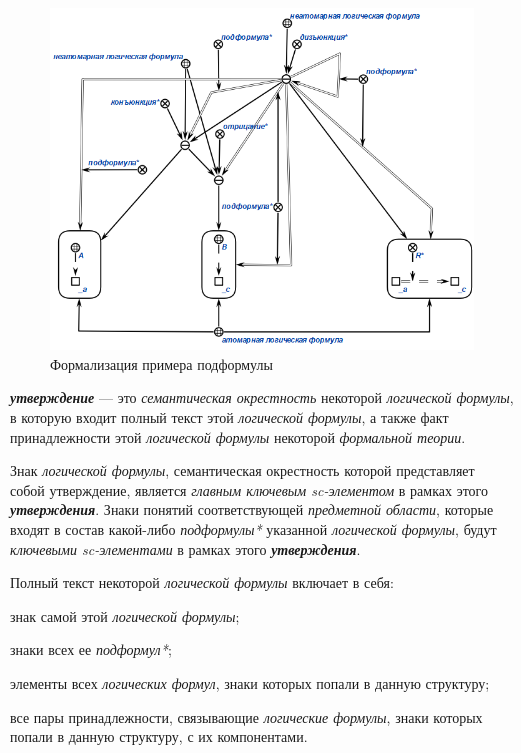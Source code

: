 \begin{SCn}
\end{SCn}

\begin{figure}[H]
	\includegraphics[scale=0.8]{author/part2/figures/logic/subformula.png}
	\caption{Формализация примера подформулы}
	\label{fig:modus_ponens}
\end{figure}

\textbf{\textit{утверждение}} --- это \textit{семантическая окрестность} некоторой \textit{логической формулы}, в которую входит полный текст этой \textit{логической формулы}, а также факт принадлежности этой \textit{логической формулы} некоторой \textit{формальной теории}.

Знак \textit{логической формулы}, семантическая окрестность которой представляет собой утверждение, является \textit{главным ключевым sc-элементом\scnrolesign} в рамках этого \textbf{\textit{утверждения}}. Знаки понятий соответствующей \textit{предметной области}, которые входят в состав какой-либо \textit{подформулы*} указанной \textit{логической формулы}, будут \textit{ключевыми sc-элементами\scnrolesign} в рамках этого \textbf{\textit{утверждения}}.
	
Полный текст некоторой \textit{логической формулы} включает в себя:
\begin{textitemize}
	\item{знак самой этой \textit{логической формулы}};
	\item{знаки всех ее \textit{подформул*}};
	\item{элементы всех \textit{логических формул}, знаки которых попали в данную структуру;}
	\item{все пары принадлежности, связывающие \textit{логические формулы}, знаки которых попали в данную структуру, с их компонентами.}
\end{textitemize}

